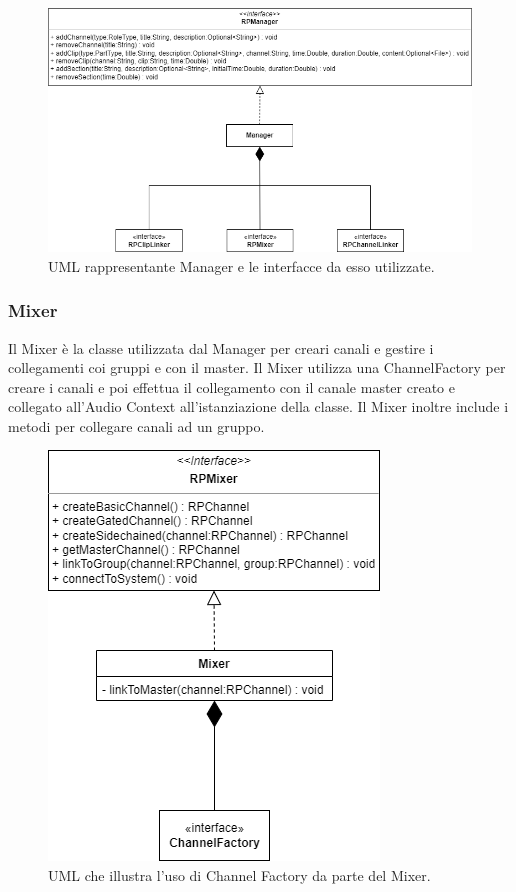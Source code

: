 \documentclass[a4paper,12pt]{report}
\begin{document}
\begin{figure}[H]
\centering{}
\includegraphics[width=\textwidth]{img/manager.png}
\caption{UML rappresentante Manager e le interfacce da esso utilizzate.}
\end{figure}

\subsubsection{Mixer}
Il Mixer è la classe utilizzata dal Manager per creari canali e gestire i collegamenti coi gruppi e con il master. Il Mixer utilizza una ChannelFactory per creare i canali e poi effettua il collegamento con il canale master creato e collegato all'Audio Context all’istanziazione della classe. Il Mixer inoltre include i metodi per collegare canali ad un gruppo.

\begin{figure}[H]
\centering{}
\includegraphics[scale=0.8]{img/mixer.png}
\caption{UML che illustra l'uso di Channel Factory da parte del Mixer.}
\end{figure}
\end{document}
